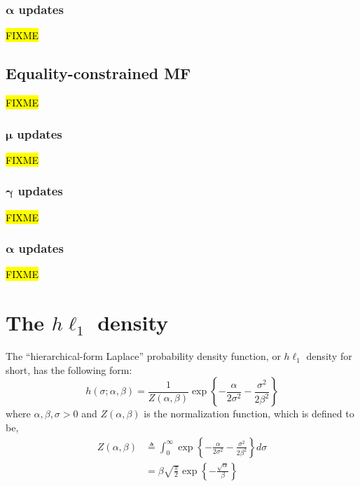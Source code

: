 \documentclass{article}
\newcommand{\m}[1]{\boldsymbol{#1}}
\begin{document}
\subsubsection{$\m{\alpha}$ updates}
\hl{FIXME}

\subsection{Equality-constrained MF}
\hl{FIXME}

\subsubsection{$\m{\mu}$ updates}
\hl{FIXME}

\subsubsection{$\m{\gamma}$ updates}
\hl{FIXME}

\subsubsection{$\m{\alpha}$ updates}
\hl{FIXME}

\section{The $h\ell_1$ density}
\label{s:hprior}
The ``hierarchical-form Laplace'' probability density function,
or $h\ell_1$ density for short, has the following form:
\begin{equation}
h(\sigma; \alpha, \beta) =
 \frac{1}{Z(\alpha, \beta)}
 \exp\left\{
  -\frac{\alpha}{2 \sigma^2}
  -\frac{\sigma^2}{2 \beta^2}
 \right\}
\label{eq:hprior}
\end{equation}
where $\alpha, \beta, \sigma > 0$ and $Z(\alpha, \beta)$ is the
normalization function, which is defined to be,
\begin{equation}
\begin{aligned}
Z(\alpha, \beta) &\triangleq
 \int_0^\infty \exp\left\{
  -\frac{\alpha}{2 \sigma^2}
  -\frac{\sigma^2}{2 \beta^2}
 \right\} d\sigma
\\ &=
 \beta \sqrt{\frac{\pi}{2}}
 \exp\left\{ -\frac{\sqrt{\alpha}}{\beta} \right\}
\end{aligned}
\label{eq:hprior_z}
\end{equation}
\end{document}
